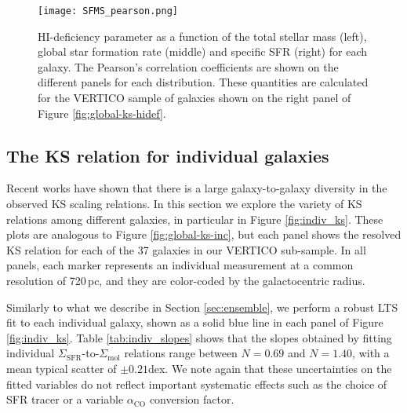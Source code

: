 \documentclass[longauth]{aa}
\begin{document}
\begin{figure*}
\centering
\texttt{[image: SFMS\_pearson.png]}
\caption{HI-deficiency parameter as a function of the total stellar mass (left), global star formation rate (middle) and specific SFR (right) for each galaxy. The Pearson's correlation coefficients are shown on the different panels for each distribution. These quantities are calculated for the VERTICO sample of galaxies shown on the right panel of Figure \ref{fig:global-ks-hidef}.
}
\label{fig:pearson}
\end{figure*}

\subsection{The KS relation for individual galaxies}
\label{sec:individual}

Recent works \citep[e.g.,][]{Lin2019,Ellison2021,Pessa2021,Querejeta2021} have shown that there is a large galaxy-to-galaxy diversity in the observed KS scaling relations. In this section we explore the variety of KS relations among different galaxies, in particular in Figure \ref{fig:indiv_ks}. These plots are analogous to Figure \ref{fig:global-ks-inc}, but each panel shows the resolved KS relation for each of the 37 galaxies in our VERTICO sub-sample. In all panels, each marker represents an individual measurement at a common resolution of 720\,pc, and they are color-coded by the galactocentric radius.

Similarly to what we describe in Section \ref{sec:ensemble}, we perform a robust LTS fit to each individual galaxy, shown as a solid blue line in each panel of Figure \ref{fig:indiv_ks}. Table \ref{tab:indiv_slopes} shows that the slopes obtained by fitting individual $\Sigma_\textrm{SFR}$-to-$\Sigma_\textrm{mol}$ relations range between $N=0.69$ and $N=1.40$, with a mean typical scatter of $\pm0.21$dex. We note again that these uncertainties on the fitted variables do not reflect important systematic effects such as the choice of SFR tracer or a variable $\alpha_\textrm{CO}$ conversion factor. 
\end{document}

